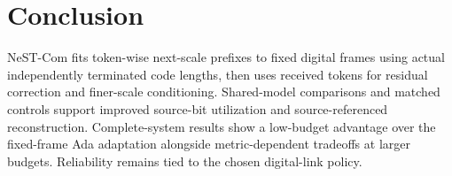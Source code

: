 \section{Conclusion}
NeST-Com fits token-wise next-scale prefixes to fixed digital frames using actual independently terminated code lengths, then uses received tokens for residual correction and finer-scale conditioning. Shared-model comparisons and matched controls support improved source-bit utilization and source-referenced reconstruction. Complete-system results show a low-budget advantage over the fixed-frame Ada adaptation alongside metric-dependent tradeoffs at larger budgets. Reliability remains tied to the chosen digital-link policy.

